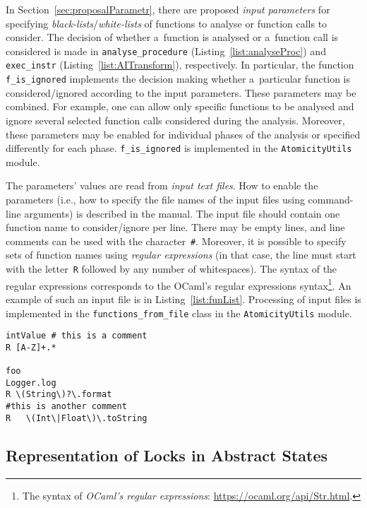 In Section~\ref{sec:proposalParametr}, there are proposed \emph{input parameters} for specifying \emph{black-lists}/\emph{white-lists} of functions to analyse or function calls to consider. The decision of whether a~function is analysed or a~function call is considered is made in \texttt{analyse\_procedure} (Listing~\ref{list:analyseProc}) and \texttt{exec\_instr} (Listing~\ref{list:AITransform}), respectively. In particular, the function \texttt{f\_is\_ignored} implements the decision making whether a~particular function is considered/ignored according to the input parameters. These parameters may be combined. For example, one can allow only specific functions to be analysed and ignore several selected function calls considered during the analysis. Moreover, these parameters may be enabled for individual phases of the analysis or specified differently for each phase. \texttt{f\_is\_ignored} is implemented in the \texttt{AtomicityUtils} module.

The parameters' values are read from \emph{input text files}. How to enable the parameters (i.e., how to specify the file names of the input files using command-line arguments) is described in the manual. The input file should contain one function name to consider/ignore per line. There may be empty lines, and line comments can be used with the character~\texttt{\#}. Moreover, it is possible to specify sets of function names using \emph{regular expressions} (in that case, the line must start with the letter~\texttt{R} followed by any number of whitespaces). The syntax of the regular expressions corresponds to the OCaml's regular expressions syntax\footnote{The syntax of \emph{OCaml's regular expressions}: \url{https://ocaml.org/api/Str.html}.}. An example of such an input file is in Listing~\ref{list:funList}. Processing of input files is implemented in the \texttt{functions\_from\_file} class in the \texttt{AtomicityUtils} module.

\begin{lstlisting}[style=plain, label={list:funList}, float=hbt, caption={An example of an \emph{input text file} with a~\emph{black-list}/\emph{white-list} of functions to analyse or function calls to consider}]
intValue # this is a comment
R [A-Z]+.*

foo
Logger.log
R \(String\)?\.format
#this is another comment
R   \(Int\|Float\)\.toString
\end{lstlisting}

\subsection{Representation of Locks in Abstract States}


